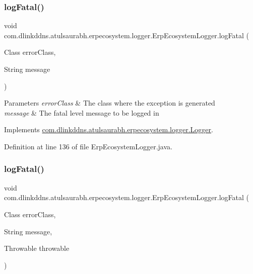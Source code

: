 \subsubsection{\texorpdfstring{log\+Fatal()}{logFatal()}\hspace{0.1cm}{\footnotesize\ttfamily [2/3]}}
{\footnotesize\ttfamily void com.\+dlinkddns.\+atulsaurabh.\+erpecosystem.\+logger.\+Erp\+Ecosystem\+Logger.\+log\+Fatal (\begin{DoxyParamCaption}\item[{Class}]{error\+Class,  }\item[{String}]{message }\end{DoxyParamCaption})}


\begin{DoxyParams}{Parameters}
{\em error\+Class} & The class where the exception is generated \\
\hline
{\em message} & The fatal level message to be logged in \\
\hline
\end{DoxyParams}


Implements \mbox{\hyperlink{interfacecom_1_1dlinkddns_1_1atulsaurabh_1_1erpecosystem_1_1logger_1_1_logger_ae9763257a2db31ecdfd4675bcdcd3bd0}{com.\+dlinkddns.\+atulsaurabh.\+erpecosystem.\+logger.\+Logger}}.



Definition at line 136 of file Erp\+Ecosystem\+Logger.\+java.

\mbox{\label{classcom_1_1dlinkddns_1_1atulsaurabh_1_1erpecosystem_1_1logger_1_1_erp_ecosystem_logger_a3def664f09892d36bbff6343fa8f3d6f}} 
\subsubsection{\texorpdfstring{log\+Fatal()}{logFatal()}\hspace{0.1cm}{\footnotesize\ttfamily [3/3]}}
{\footnotesize\ttfamily void com.\+dlinkddns.\+atulsaurabh.\+erpecosystem.\+logger.\+Erp\+Ecosystem\+Logger.\+log\+Fatal (\begin{DoxyParamCaption}\item[{Class}]{error\+Class,  }\item[{String}]{message,  }\item[{Throwable}]{throwable }\end{DoxyParamCaption})}


